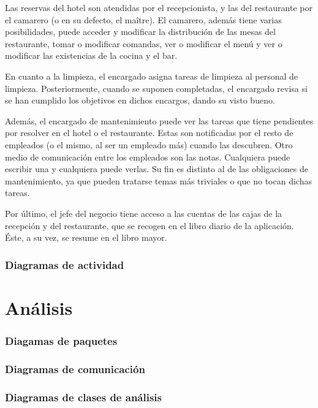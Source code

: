 \documentclass[spanish,a4paper,11pt, twoside]{report}	%
\begin{document}
	Las reservas del hotel son atendidas por el recepcionista, y las del restaurante por el camarero (o en su defecto, el maître). El camarero, además tiene varias posibilidades, puede acceder y modificar la distribución de las mesas del restaurante, tomar o modificar comandas, ver o modificar el menú y ver o modificar las existencias de la cocina y el bar.

	En cuanto a la limpieza, el encargado asigna tareas de limpieza al personal de limpieza. Posteriormente, cuando se suponen completadas, el encargado revisa si se han cumplido los objetivos en dichos encargos, dando su visto bueno.

	Además, el encargado de mantenimiento puede ver las tareas que tiene pendientes por resolver en el hotel o el restaurante. Estas son notificadas por el resto de empleados (o el mismo, al ser un empleado más) cuando las descubren. Otro medio de comunicación entre los empleados son las notas. Cualquiera puede escribir una y cualquiera puede verlas. Su fin es distinto al de las obligaciones de mantenimiento, ya que pueden tratarse temas más triviales o que no tocan dichas tareas.
		
	Por último, el jefe del negocio tiene acceso a las cuentas de las cajas de la recepción y del restaurante, que se recogen en el libro diario de la aplicación. Éste, a su vez, se resume en el libro mayor.
	

	\section{Diagramas de actividad}






\setcounter{section}{0}
\part{Análisis}
	\section{Diagamas de paquetes}


	\section{Diagramas de comunicación}


	\section{Diagramas de clases de análisis}
\end{document}

